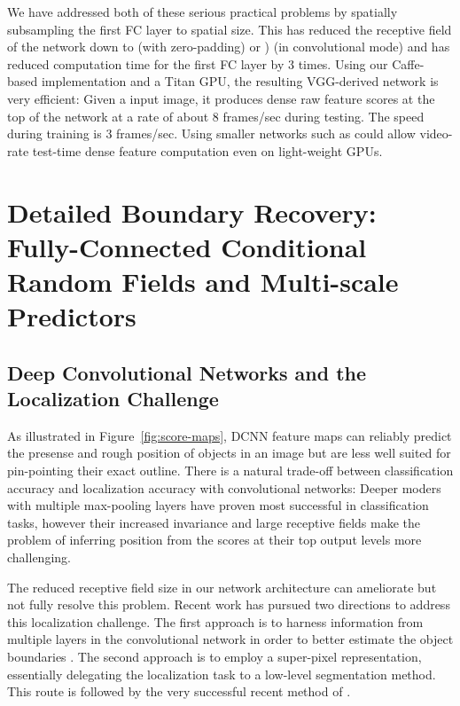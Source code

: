 We have addressed both of these serious practical problems by spatially
subsampling the first FC layer to  spatial size. This has reduced the
receptive field of the network down to  (with zero-padding) or
) (in convolutional mode) and has reduced computation time for
the first FC layer by 3 times. Using our Caffe-based implementation and a
Titan GPU, the resulting VGG-derived network is very efficient: Given a
 input image, it produces  dense raw feature scores at
the top of the network at a rate of about 8 frames/sec during testing. The
speed during training is 3 frames/sec. Using smaller networks such as
\cite{KrizhevskyNIPS2013} could allow video-rate test-time dense feature
computation even on light-weight GPUs.

\section{Detailed Boundary Recovery: Fully-Connected Conditional Random Fields
  and Multi-scale Predictors}
\label{sec:boundary-recovery}

\subsection{Deep Convolutional Networks and the Localization Challenge}
\label{sec:local-chal}

As illustrated in Figure~\ref{fig:score-maps}, DCNN feature maps can
reliably predict the presense and rough position of objects in an image but
are less well suited for pin-pointing their exact outline. There is a natural
trade-off between classification accuracy and localization accuracy with
convolutional networks: Deeper moders with multiple max-pooling layers have
proven most successful in classification tasks, however their increased
invariance and large receptive fields make the problem of inferring position
from the scores at their top output levels more challenging.

The reduced receptive field size in our network architecture can ameliorate
but not fully resolve this problem. Recent work has pursued two directions to
address this localization challenge. The first approach is to harness
information from multiple layers in the convolutional network in order to
better estimate the object boundaries \citep{long2014fully, eigen2014predicting}. The second approach is
to employ a super-pixel representation, essentially delegating the
localization task to a low-level segmentation method. This route is followed
by the very successful recent method of \cite{mostajabi2014feedforward}.

